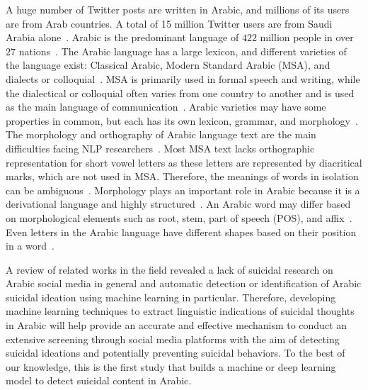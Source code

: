 \documentclass[sn-mathphys,Numbered]{sn-jnl}%
\begin{document}
A huge number of Twitter posts are written in Arabic, and millions of its users are from Arab countries. A total of 15 million Twitter users are from Saudi Arabia alone~\cite{16nhttps://doi.org/10.48550/arxiv.2004.04315}. Arabic is the predominant language of $422$ million people in over $27$ nations~\cite{17nBOUDAD20182479}. 
The Arabic language has a large lexicon, and different varieties of the language exist: Classical Arabic, Modern Standard Arabic (MSA), and dialects or colloquial~\cite{17nBOUDAD20182479,18n10.1145/1644879.1644881}. %
MSA is primarily used in formal speech and writing, while the dialectical or colloquial often varies from one country to another and is used as the main language of communication~\cite{17nBOUDAD20182479}. Arabic varieties may have some properties in common, but each has its own lexicon, grammar, and morphology~\cite{18n10.1145/1644879.1644881}. The morphology and orthography of Arabic language text are the main difficulties facing NLP researchers~\cite{17nBOUDAD20182479,19n7945623}. Most MSA text lacks orthographic representation for short vowel letters as these letters are represented by diacritical marks, which are not used in MSA. Therefore, the meanings of words in isolation can be ambiguous~\cite{17nBOUDAD20182479,18n10.1145/1644879.1644881}. Morphology plays an important role in Arabic because it is a derivational language and highly structured~\cite{18n10.1145/1644879.1644881}. An Arabic word may differ based on morphological elements such as root, stem, part of speech (POS), and affix~\cite{17nBOUDAD20182479}. Even letters in the Arabic language have different shapes based on their position in a word~\cite{18n10.1145/1644879.1644881}. 


A review of related works in the field revealed a lack of suicidal research on Arabic social media in general and automatic detection or identification of Arabic suicidal ideation using machine learning in particular. Therefore, developing machine learning techniques to extract linguistic indications of suicidal thoughts in Arabic will help provide an accurate and effective mechanism to conduct an extensive screening through social media platforms with the aim of detecting suicidal ideations and potentially preventing suicidal behaviors. To the best of our knowledge, this is the first study that builds a machine or deep learning model to detect suicidal content in Arabic.
\end{document}

